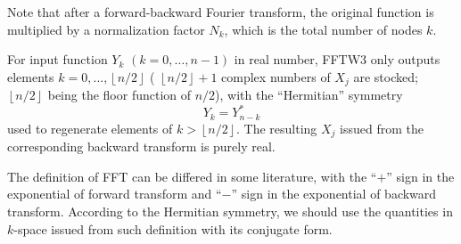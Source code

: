 Note that after a forward-backward Fourier transform, the original
function is multiplied by a normalization factor $N_{k}$, which is
the total number of nodes $k$.

For input function $Y_{k}$ $(k=0,\ldots,n-1)$ in real number, FFTW3
only outputs elements $k=0,\ldots,\left\lfloor n/2\right\rfloor $
( $\left\lfloor n/2\right\rfloor +1$ complex numbers of $X_{j}$
are stocked; $\left\lfloor n/2\right\rfloor $ being the floor function
of $n/2$), with the “Hermitian” symmetry
\begin{equation}
Y_{k}=Y_{n-k}^{*}\label{eq:yk_conjg}
\end{equation}
used to regenerate elements of $k>\left\lfloor n/2\right\rfloor $.
The resulting $X_{j}$ issued from the corresponding backward transform
is purely real. 

The definition of \acs{FFT} can be differed in some literature, with
the ``$+$'' sign in the exponential of forward transform and ``$-$''
sign in the exponential of backward transform. According to the Hermitian
symmetry, we should use the quantities in $k$-space issued from such
definition with its conjugate form.
